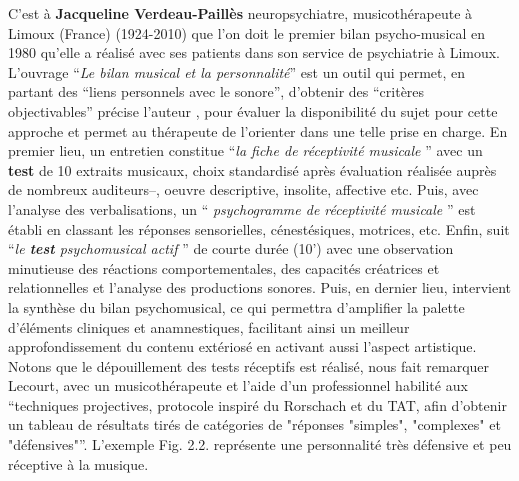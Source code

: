 C'est à \textbf{Jacqueline Verdeau-Paillès} neuropsychiatre,
  musicothérapeute à Limoux (France) (1924-2010) que l'on doit le premier bilan
                     psycho-musical en 1980 qu'elle a réalisé avec ses patients dans son service
                     de psychiatrie à Limoux.
L'ouvrage \enquote {\textit{Le bilan musical et la personnalité}}\autocite{verdeau-pailles:bilan}
                     est un outil qui permet, en partant des \enquote {liens personnels avec le sonore}, d'obtenir des \enquote {critères objectivables} précise l'auteur  \autocite[37]{vrait_musicotherapie_2018}, pour évaluer la disponibilité du sujet pour cette
                     approche et permet au thérapeute de l'orienter dans
                                 une telle prise en charge. En premier lieu, un entretien constitue \enquote {\textit{la fiche de réceptivité musicale} } avec un \textbf{test} de 10 extraits musicaux, choix standardisé après évaluation réalisée auprès de nombreux auditeurs--, oeuvre descriptive, insolite, affective etc.
Puis, avec l'analyse des verbalisations, un \enquote { \textit{psychogramme de réceptivité musicale} } est établi en classant les réponses sensorielles, cénestésiques, motrices, etc. Enfin, suit \enquote {\textit{le \textbf{test}  psychomusical actif} } \autocite{verdeau_expression} de courte durée (10') avec une observation minutieuse des réactions comportementales, des capacités créatrices et relationnelles et l'analyse des productions sonores. Puis, en  dernier lieu, intervient la synthèse du bilan psychomusical, ce qui permettra d'amplifier la palette d'éléments
                                cliniques et anamnestiques, facilitant ainsi un meilleur approfondissement du
                                 contenu extériosé en activant aussi l'aspect artistique.
Notons que le dépouillement des tests réceptifs est réalisé, nous fait remarquer Lecourt, avec un 
musicothérapeute et l'aide d'un professionnel habilité aux \enquote {techniques projectives, protocole 
inspiré du Rorschach et du TAT, afin d'obtenir un tableau de résultats tirés de catégories de "réponses 
"simples", "complexes" et "défensives"}\autocite[p.86] {lecourt_les_2017}. L'exemple Fig. 2.2. représente  
une personnalité très défensive et peu réceptive à la musique. 
